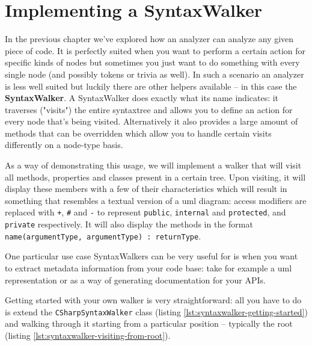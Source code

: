 \chapter{Implementing a SyntaxWalker}
\label{sec:syntaxwalker}

In the previous chapter we've explored how an analyzer can analyze any given piece of code. It is perfectly suited when you want to perform a certain action for specific kinds of nodes but sometimes you just want to do something with every single node (and possibly tokens or trivia as well). In such a scenario an analyzer is less well suited but luckily there are other helpers available -- in this case the \textbf{SyntaxWalker}. A SyntaxWalker does exactly what its name indicates: it traverses ("visits") the entire \gls{syntaxtree} and allows you to define an action for every node that's being visited. Alternatively it also provides a large amount of methods that can be overridden which allow you to handle certain visits differently on a node-type basis. 

As a way of demonstrating this usage, we will implement a walker that will visit all methods, properties and classes present in a certain tree. Upon visiting, it will display these members with a few of their characteristics which will result in something that resembles a textual version of a \gls{uml} diagram: access modifiers are replaced with \texttt{+}, \texttt{\#} and \texttt{-} to represent \texttt{public}, \texttt{internal} and \texttt{protected}, and \texttt{private} respectively. It will also display the methods in the format \texttt{name(argumentType, argumentType) : returnType}.

One particular use case SyntaxWalkers can be very useful for is when you want to extract \gls{metadata} information from your code base: take for example a \gls{uml} representation or as a way of generating documentation for your APIs.

Getting started with your own walker is very straightforward: all you have to do is extend the \texttt{CSharpSyntaxWalker} class (listing \ref{lst:syntaxwalker-getting-started}) and walking through it starting from a particular position -- typically the root (listing \ref{lst:syntaxwalker-visiting-from-root}).

\clearpage


